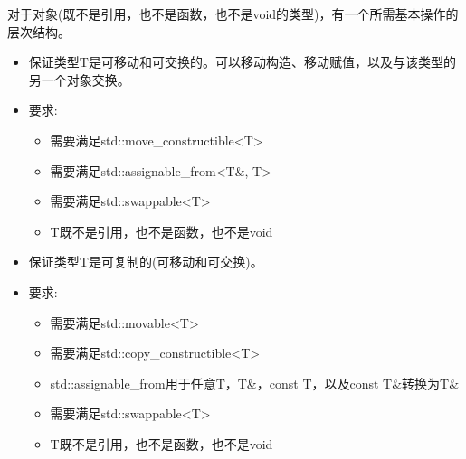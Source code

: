
对于对象(既不是引用，也不是函数，也不是void的类型)，有一个所需基本操作的层次结构。


\begin{itemize}
\item
保证类型T是可移动和可交换的。可以移动构造、移动赋值，以及与该类型的另一个对象交换。

\item
要求:
\begin{itemize}
\item
需要满足std::move\_constructible<T>

\item
需要满足std::assignable\_from<T\&, T>

\item
需要满足std::swappable<T>

\item
T既不是引用，也不是函数，也不是void
\end{itemize}
\end{itemize}


\begin{itemize}
\item
保证类型T是可复制的(可移动和可交换)。

\item
要求:
\begin{itemize}
\item
需要满足std::movable<T>

\item
需要满足std::copy\_constructible<T>

\item
std::assignable\_from用于任意T，T\&，const T，以及const T\&转换为T\&

\item
需要满足std::swappable<T>

\item
T既不是引用，也不是函数，也不是void
\end{itemize}
\end{itemize}



